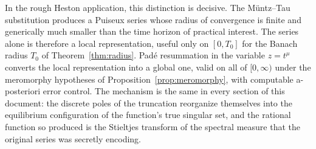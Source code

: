 \documentclass[11pt]{article}
\theoremstyle{definition}
\theoremstyle{remark}
\begin{document}
In the rough Heston application, this distinction is decisive. The M\"untz--Tau substitution produces a Puiseux series whose radius of convergence is finite and generically much smaller than the time horizon of practical interest. The series alone is therefore a local representation, useful only on $[0,T_{0}]$ for the Banach radius $T_{0}$ of Theorem~\ref{thm:radius}. Pad\'e resummation in the variable $z=t^{\mu}$ converts the local representation into a global one, valid on all of $[0,\infty)$ under the meromorphy hypotheses of Proposition~\ref{prop:meromorphy}, with computable a-posteriori error control. The mechanism is the same in every section of this document: the discrete poles of the truncation reorganize themselves into the equilibrium configuration of the function's true singular set, and the rational function so produced is the Stieltjes transform of the spectral measure that the original series was secretly encoding.
\end{document}
